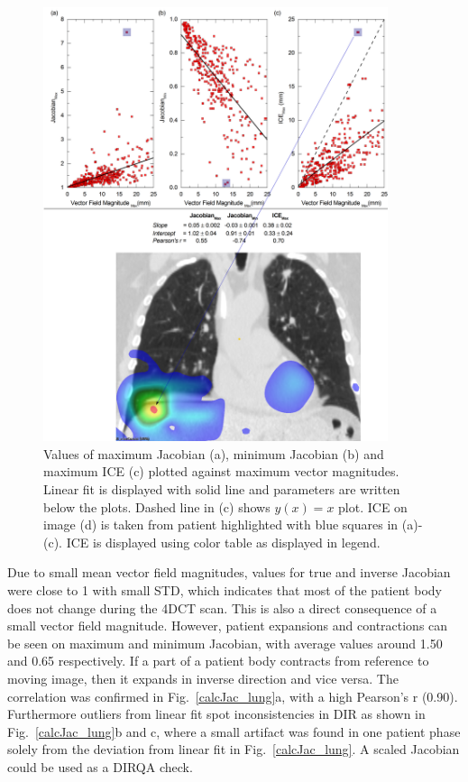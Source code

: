 \documentclass[type=dr, dr=rernat, accentcolor=tud7b,colorbacktitle, bigchapter, openright, twoside, 12pt ]{tudthesis}
\begin{document}
\begin{figure}[H]
	\begin{center}		
		\includegraphics[width=0.9\textwidth]{./Images/maxVf_lung.png}
		\caption{Values of maximum Jacobian (a), minimum Jacobian (b) and maximum ICE (c) plotted against maximum vector magnitudes. Linear fit is displayed with solid line and parameters are written below the plots. Dashed line in (c) shows $y(x)= x$ plot. ICE on image (d) is taken from patient highlighted with blue squares in (a)-(c).
			ICE is displayed using color table as displayed in legend.}
		\label{maxvf}
	\end{center}
\end{figure}

\newpage



Due to small mean vector field magnitudes, values for true and inverse Jacobian were close to 1 with small STD, which indicates that most of the patient body does not change during the 4DCT scan. This is also a direct consequence of a small vector field magnitude.
However, patient expansions and contractions can be seen on maximum and minimum Jacobian, with average values around 1.50 and 0.65 respectively. If a part of a patient body contracts from reference to moving image, 
then it expands in inverse direction and vice versa. The correlation was confirmed in Fig.~\ref{calcJac_lung}a, with a high Pearson's r (0.90). Furthermore outliers from linear fit spot inconsistencies
in DIR as shown in Fig.~\ref{calcJac_lung}b and c, where a small artifact was found in one patient phase solely from the deviation from linear fit in Fig.~\ref{calcJac_lung}. A scaled Jacobian could be used as a DIRQA check.
\end{document}
